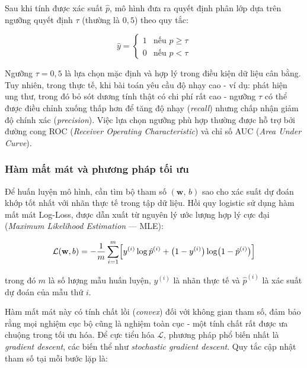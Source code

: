 Sau khi tính được xác suất $\hat{p}$, mô hình đưa ra quyết định phân lớp dựa trên ngưỡng quyết định $\tau$ (thường là $0{,}5$) theo quy tắc:
 
\begin{equation}
  \hat{y} =
  \begin{cases}
    1 & \text{nếu } \hat{p} \geq \tau \\
    0 & \text{nếu } \hat{p} < \tau
  \end{cases}
  \label{eq:decision}
\end{equation}
 
Ngưỡng $\tau = 0{,}5$ là lựa chọn mặc định và hợp lý trong điều kiện dữ liệu cân bằng. Tuy nhiên, trong thực tế, khi bài toán yêu cầu độ nhạy cao - ví dụ: phát hiện ung thư, trong đó bỏ sót dương tính thật có chi phí rất cao - ngưỡng $\tau$ có thể được điều chỉnh xuống thấp hơn để tăng độ nhạy (\textit{recall}) nhưng chấp nhận giảm độ chính xác (\textit{precision}). Việc lựa chọn ngưỡng phù hợp thường được hỗ trợ bởi đường cong ROC (\textit{Receiver Operating Characteristic}) và chỉ số AUC (\textit{Area Under Curve}).
 
\subsubsection{Hàm mất mát và phương pháp tối ưu}
\label{sec:gradient}
 
Để huấn luyện mô hình, cần tìm bộ tham số $(\mathbf{w},\,b)$ sao cho xác suất dự đoán khớp tốt nhất với nhãn thực tế trong tập dữ liệu. Hồi quy logistic sử dụng hàm mất mát Log-Loss, được dẫn xuất từ nguyên lý ước lượng hợp lý cực đại (\textit{Maximum Likelihood Estimation} --- MLE):
 
\begin{equation}
  \mathcal{L}(\mathbf{w}, b)
  = -\frac{1}{m} \sum_{i=1}^{m}
    \Bigl[
      y^{(i)} \log \hat{p}^{(i)}
      + \bigl(1 - y^{(i)}\bigr) \log \bigl(1 - \hat{p}^{(i)}\bigr)
    \Bigr]
  \label{eq:loss}
\end{equation}
 
\noindent trong đó $m$ là số lượng mẫu huấn luyện, $y^{(i)}$ là nhãn thực tế và $\hat{p}^{(i)}$ là xác suất dự đoán của mẫu thứ $i$.
 
Hàm mất mát này có tính chất lồi (\textit{convex}) đối với không gian tham số, đảm bảo rằng mọi nghiệm cục bộ cũng là nghiệm toàn cục - một tính chất rất được ưa chuộng trong tối ưu hóa. Để cực tiểu hóa $\mathcal{L}$, phương pháp phổ biến nhất là \textit{gradient descent}, các biến thể như \textit{stochastic gradient descent}. Quy tắc cập nhật tham số tại mỗi bước lặp là:
 
